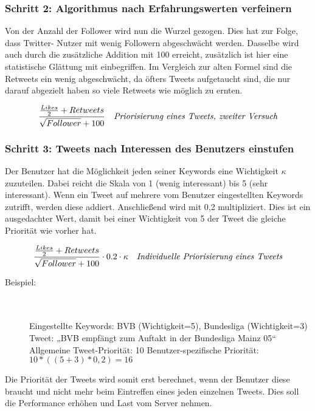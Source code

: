 \subsubsection*{Schritt 2: Algorithmus nach Erfahrungswerten verfeinern}

Von der Anzahl der Follower wird nun die Wurzel gezogen. Dies hat zur Folge, dass Twitter-
Nutzer mit wenig Followern abgeschwächt werden. Dasselbe wird auch durch die zusätzliche 
Addition mit 100 erreicht, zusätzlich ist hier eine statistische Glättung mit 
einbegriffen. Im Vergleich zur alten Formel sind die Retweets ein wenig abgeschwächt, da 
öfters Tweets aufgetaucht sind, die nur darauf abgezielt haben so viele Retweets wie 
möglich zu ernten. 
 
\begin{equation}
\frac{\frac{Likes}{2} + Retweets}{\sqrt{Follower} + 100} 
\quad
\text{\textit{Priorisierung eines Tweets, zweiter Versuch}}
\end{equation}

\subsubsection*{Schritt 3: Tweets nach Interessen des Benutzers einstufen}

Der Benutzer hat die Möglichkeit jeden seiner Keywords eine Wichtigkeit \(\kappa\) zuzuteilen. Dabei reicht 
die Skala von 1 (wenig interessant) bis 5 (sehr interessant).  Wenn ein Tweet auf mehrere vom Benutzer 
eingestellten Keywords zutrifft, werden diese addiert. Anschließend wird mit 0,2 multipliziert. Dies ist ein 
ausgedachter Wert, damit bei einer Wichtigkeit von 5 der Tweet die gleiche Priorität wie vorher hat. 

\begin{equation}
\frac{\frac{Likes}{2} + Retweets}{\sqrt{Follower} + 100} \cdot 0.2 \cdot \kappa 
\quad
\text{\textit{Individuelle Priorisierung eines Tweets}}
\end{equation}
\bigskip 
\begin{description}
	\item [Beispiel:] \hfill \\\\ Eingestellte Keywords: BVB (Wichtigkeit=5), Bundesliga (Wichtigkeit=3) \newline Tweet: „BVB empfängt zum Auftakt in der Bundesliga Mainz 05“ \newline Allgemeine Tweet-Priorität: 10 \newline Benutzer-spezifische Priorität: \(10 * ((5 + 3) * 0,2) = 16 \) 
\end{description}
Die Priorität der Tweets wird somit erst berechnet, wenn der Benutzer diese braucht und nicht mehr beim 
Eintreffen eines jeden einzelnen Tweets. Dies soll die Performance erhöhen und Last vom Server nehmen. 

